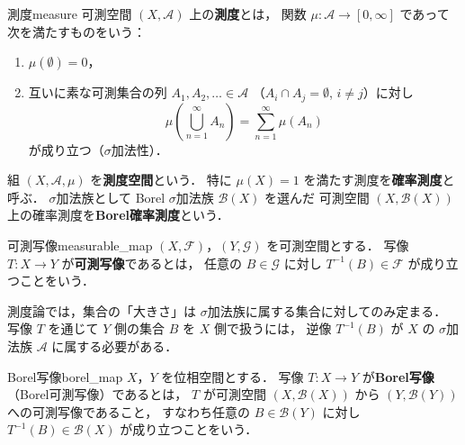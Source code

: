 \documentclass[uplatex, dvipdfmx]{jsarticle}
\begin{document}
\begin{definition}{測度}{measure}
可測空間 $(X,\mathcal{A})$ 上の\textbf{測度}とは，
関数 $\mu\colon\mathcal{A}\to[0,\infty]$ であって次を満たすものをいう：
\begin{enumerate}
  \item $\mu(\emptyset)=0$，
  \item 互いに素な可測集合の列 $A_1,A_2,\ldots\in\mathcal{A}$
        （$A_i\cap A_j=\emptyset$, $i\neq j$）に対し
        \[
          \mu\!\left(\bigcup_{n=1}^{\infty}A_n\right)
          =\sum_{n=1}^{\infty}\mu(A_n)
        \]
        が成り立つ（$\sigma$加法性）．
\end{enumerate}
組 $(X,\mathcal{A},\mu)$ を\textbf{測度空間}という．
特に $\mu(X)=1$ を満たす測度を\textbf{確率測度}と呼ぶ．
$\sigma$加法族として Borel $\sigma$加法族 $\mathcal{B}(X)$ を選んだ
可測空間 $(X,\mathcal{B}(X))$ 上の確率測度を\textbf{Borel確率測度}という．
\end{definition}

\begin{definition}{可測写像}{measurable_map}
$(X,\mathcal{F})$，$(Y,\mathcal{G})$ を可測空間とする．
写像 $T\colon X\to Y$ が\textbf{可測写像}であるとは，
任意の $B\in\mathcal{G}$ に対し $T^{-1}(B)\in\mathcal{F}$ が成り立つことをいう．
\end{definition}

測度論では，集合の「大きさ」は $\sigma$加法族に属する集合に対してのみ定まる．
写像 $T$ を通じて $Y$ 側の集合 $B$ を $X$ 側で扱うには，
逆像 $T^{-1}(B)$ が $X$ の $\sigma$加法族 $\mathcal{A}$ に属する必要がある．

\begin{definition}{Borel写像}{borel_map}
$X$，$Y$ を位相空間とする．
写像 $T\colon X\to Y$ が\textbf{Borel写像}（Borel可測写像）であるとは，
$T$ が可測空間 $(X,\mathcal{B}(X))$ から $(Y,\mathcal{B}(Y))$ への可測写像であること，
すなわち任意の $B\in\mathcal{B}(Y)$ に対し $T^{-1}(B)\in\mathcal{B}(X)$ が成り立つことをいう．
\end{definition}
\end{document}
